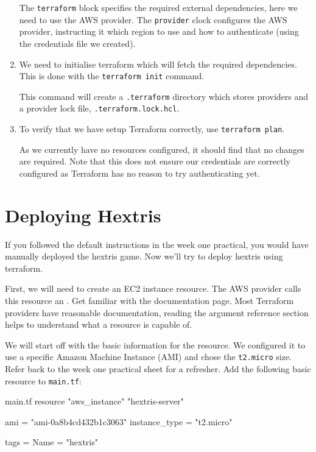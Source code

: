 \documentclass{csse4400}
\begin{document}
\begin{enumerate}
The \texttt{terraform} block specifies the required external dependencies, here we need to use the AWS provider.
The \texttt{provider} clock configures the AWS provider, instructing it which region to use and how to authenticate (using the credentials file we created).

\item We need to initialise terraform which will fetch the required dependencies. This is done with the \texttt{terraform init} command.

This command will create a \texttt{.terraform} directory which stores providers and a provider lock file, \texttt{.terraform.lock.hcl}.

\item To verify that we have setup Terraform correctly, use \texttt{terraform plan}.

As we currently have no resources configured, it should find that no changes are required.
Note that this does not ensure our credentials are correctly configured as Terraform has no reason to try authenticating yet.

\end{enumerate}

\section{Deploying Hextris}
If you followed the default instructions in the week one practical, you would have manually deployed the hextris game.
Now we'll try to deploy hextris using terraform.

First, we will need to create an EC2 instance resource.
The AWS provider calls this resource an .
Get familiar with the documentation page.
Most Terraform providers have reasonable documentation, reading the argument reference section helps to understand what a resource is capable of.

We will start off with the basic information for the resource.
We configured it to use a specific Amazon Machine Instance (AMI) and chose the \texttt{t2.micro} size.
Refer back to the week one practical sheet for a refresher.
Add the following basic resource to \texttt{main.tf}:

\begin{code}[language=terraform]{main.tf}
resource "aws_instance" "hextris-server" {
    ami           = "ami-0a8b4cd432b1c3063"
    instance_type = "t2.micro"
    
    tags = {
        Name = "hextris"
    }
}      
\end{code}
\end{document}
